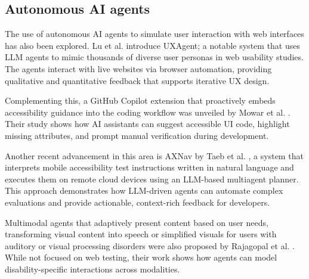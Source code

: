 \subsection{Autonomous AI agents}

The use of autonomous \ac{AI} agents to simulate user interaction with web interfaces has also been explored. Lu et al. \cite{lu2025uxagent} introduce UXAgent; a notable system that uses LLM agents to mimic thousands of diverse user personas in web usability studies. The agents interact with live websites via browser automation, providing qualitative and quantitative feedback that supports iterative UX design. 

Complementing this, a GitHub Copilot extension that proactively embeds accessibility guidance into the coding workflow was unveiled by Mowar et al. \cite{mowar2025codea11y}. Their study shows how \ac{AI} assistants can suggest accessible \ac{UI} code, highlight missing attributes, and prompt manual verification during development.

Another recent advancement in this area is AXNav by Taeb et al. \cite{taeb2024axnav}, a system that interprets mobile accessibility test instructions written in natural language and executes them on remote cloud devices using an LLM-based multiagent planner. This approach demonstrates how LLM-driven agents can automate complex evaluations and provide actionable, context-rich feedback for developers.

Multimodal agents that adaptively present content based on user needs, transforming visual content into speech or simplified visuals for users with auditory or visual processing disorders were also proposed by Rajagopal et al. \cite{rajagopal2023design}. While not focused on web testing, their work shows how agents can model disability-specific interactions across modalities.

